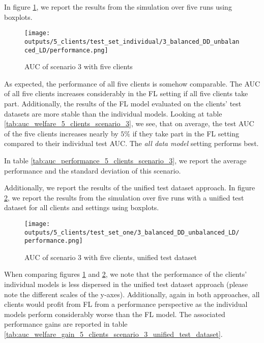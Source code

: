 In figure \ref{fig:auc_box_5_clients_scenario_3}, we report the results from the simulation over five runs using boxplots.
\begin{figure}[htb!]
    \centering
    \texttt{[image: outputs/5\_clients/test\_set\_individual/3\_balanced\_DD\_unbalanced\_LD/performance.png]}
    \caption{AUC of scenario 3 with five clients}
    \label{fig:auc_box_5_clients_scenario_3}
\end{figure}
As expected, the performance of all five clients is somehow comparable. The AUC of all five clients increases considerably in the FL setting if all five clients take part. Additionally, the results of the FL model evaluated on the clients' test datasets are more stable than the individual models. Looking at table \ref{tab:auc_welfare_5_clients_scenario_3}, we see, that on average, the test AUC of the five clients increases nearly by $5\%$ if they take part in the FL setting compared to their individual test AUC. The \emph{all data model} setting performs best.

In table \ref{tab:auc_performance_5_clients_scenario_3}, we report the average performance and the standard deviation of this scenario.


Additionally, we report the results of the unified test dataset approach. In figure \ref{fig:auc_box_5_clients_scenario_3_uni}, we report the results from the simulation over five runs with a unified test dataset for all clients and settings using boxplots.
\begin{figure}[htb!]
    \centering
    \texttt{[image: outputs/5\_clients/test\_set\_one/3\_balanced\_DD\_unbalanced\_LD/performance.png]}
    \caption{AUC of scenario 3 with five clients, unified test dataset}
    \label{fig:auc_box_5_clients_scenario_3_uni}
\end{figure}
When comparing figures \ref{fig:auc_box_5_clients_scenario_3} and \ref{fig:auc_box_5_clients_scenario_3_uni}, we note that the performance of the clients' individual models is less dispersed in the unified test dataset approach (please note the different scales of the y-axes). Additionally, again in both approaches, all clients would profit from FL from a performance perspective as the individual models perform considerably worse than the FL model.
The associated performance gains are reported in table \ref{tab:auc_welfare_gain_5_clients_scenario_3_unified_test_dataset}.


